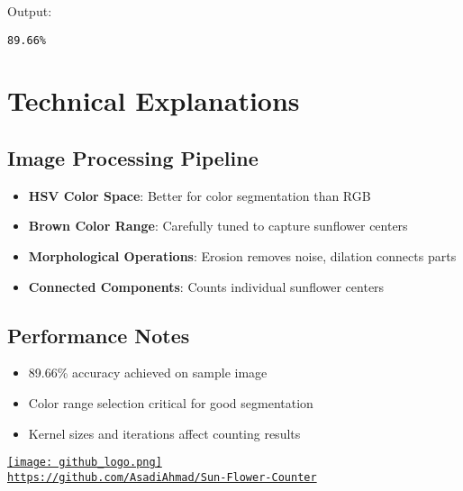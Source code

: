 \documentclass[12pt]{article}
\begin{document}
Output:
\begin{verbatim}
89.66%
\end{verbatim}

\section{Technical Explanations}

\subsection{Image Processing Pipeline}
\begin{itemize}
    \item \textbf{HSV Color Space}: Better for color segmentation than RGB
    \item \textbf{Brown Color Range}: Carefully tuned to capture sunflower centers
    \item \textbf{Morphological Operations}: Erosion removes noise, dilation connects parts
    \item \textbf{Connected Components}: Counts individual sunflower centers
\end{itemize}

\subsection{Performance Notes}
\begin{itemize}
    \item 89.66\% accuracy achieved on sample image
    \item Color range selection critical for good segmentation
    \item Kernel sizes and iterations affect counting results
\end{itemize}

\begin{center}
    \href{https://github.com/AsadiAhmad/Sun-Flower-Counter}{
        \texttt{[image: github\_logo.png]} \\
        \texttt{https://github.com/AsadiAhmad/Sun-Flower-Counter}
    }
\end{center}
\end{document}
